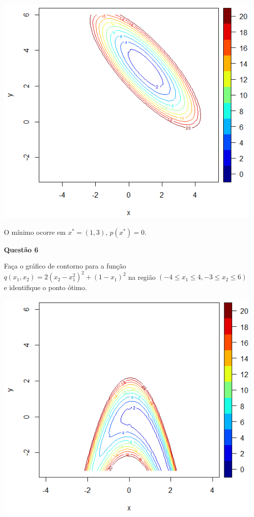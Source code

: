 \documentclass{rbfin}
\begin{document}
\begin{center}
\includegraphics[scale=0.666]{q5}
\end{center}

O mínimo ocorre em $x^* = (1,3)$, $p(x^*) = 0$.

\singlespacing

\vspace{6mm}

\large

\textbf{Questão 6}

\normalsize

\vspace{6mm}

\doublespacing

Faça o gráfico de contorno para a função $q(x_1, x_2) = 2(x_2 - x_1^2)^2 +(1 - x_1)^2$ na região $(-4 \le x_1 \le 4, -3 \le x_2 \le 6)$ e identifique o ponto ótimo.

\begin{center}
\includegraphics[scale=0.666]{q6}
\end{center}
\end{document}

